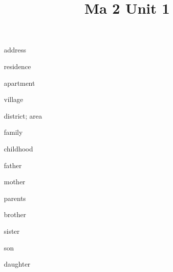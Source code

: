 \documentclass[avery5371,grid,frame]{flashcards}
\title{Ma 2 Unit 1}
\begin{document}
\begin{flashcard}{\LARGE address}
\LARGE {}
\end{flashcard}
\begin{flashcard}{\LARGE residence}
\LARGE {}
\end{flashcard}
\begin{flashcard}{\LARGE apartment}
\LARGE {}
\end{flashcard}
\begin{flashcard}{\LARGE village}
\LARGE {}
\end{flashcard}
\begin{flashcard}{\LARGE district; area}
\LARGE {}
\end{flashcard}
\begin{flashcard}{\LARGE family}
\LARGE {}
\end{flashcard}
\begin{flashcard}{\LARGE childhood}
\LARGE {}
\end{flashcard}
\begin{flashcard}{\LARGE father}
\LARGE {}
\end{flashcard}
\begin{flashcard}{\LARGE mother}
\LARGE {}
\end{flashcard}
\begin{flashcard}{\LARGE parents}
\LARGE {}
\end{flashcard}
\begin{flashcard}{\LARGE brother}
\LARGE {}
\end{flashcard}
\begin{flashcard}{\LARGE sister}
\LARGE {}
\end{flashcard}
\begin{flashcard}{\LARGE son}
\LARGE {}
\end{flashcard}
\begin{flashcard}{\LARGE daughter}
\LARGE {}
\end{flashcard}
\end{document}
